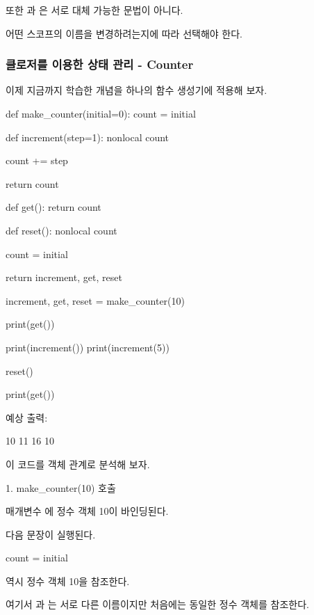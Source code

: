 또한 과 은 서로 대체 가능한 문법이 아니다.

어떤 스코프의 이름을 변경하려는지에 따라 선택해야 한다.

\subsubsection{클로저를 이용한 상태 관리 - Counter}

이제 지금까지 학습한 개념을 하나의 함수 생성기에 적용해 보자.

\begin{dhkcode}
def make_counter(initial=0):
    count = initial

    def increment(step=1):
        nonlocal count

        count += step

        return count

    def get():
        return count

    def reset():
        nonlocal count

        count = initial

    return increment, get, reset


increment, get, reset = make_counter(10)

print(get())

print(increment())
print(increment(5))

reset()

print(get())
\end{dhkcode}

예상 출력:

\begin{dhkzsh}
10
11
16
10
\end{dhkzsh}

이 코드를 객체 관계로 분석해 보자.

\begin{dhknote}
\begin{dhksmry}[centered]
1. make_counter(10) 호출
\end{dhksmry}
\end{dhknote}

매개변수 에 정수 객체 10이 바인딩된다.

다음 문장이 실행된다.

\begin{dhkcode}
count = initial
\end{dhkcode}

 역시 정수 객체 10을 참조한다.

여기서 과 는 서로 다른 이름이지만 처음에는 동일한 정수 객체를 참조한다.

